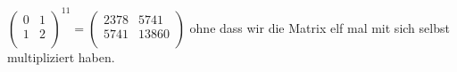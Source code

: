 \documentclass[course=erap]{aspdoc}
\begin{document}
\begin{math}
                                             \begin{pmatrix}
                                                 0 & 1 \\
                                                 1 & 2 \\
                                             \end{pmatrix}^{11} = \begin{pmatrix}
                                                                      2378 & 5741 \\
                                                                      5741 & 13860 \\
                                             \end{pmatrix}
    \end{math} ohne dass wir die Matrix elf mal mit sich selbst multipliziert haben.
\end{document}
